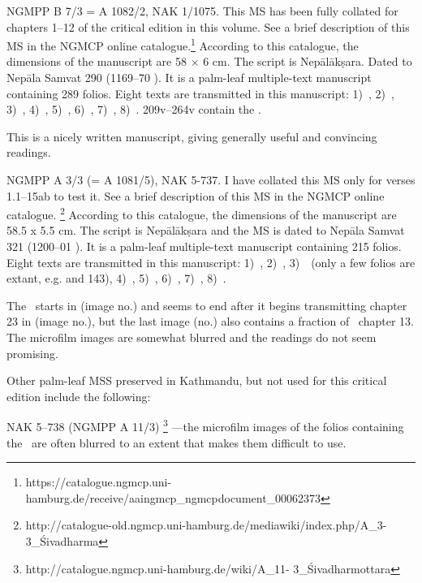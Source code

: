NGMPP B 7/3 = A 1082/2, NAK 1/1075. This MS has been 
fully collated for chapters 1--12 of
the critical edition in this volume. See a brief description of this MS
in the NGMCP online catalogue.\footnote{https://catalogue.ngmcp.uni-hamburg.de/receive/aaingmcp\_ngmcpdocument\_00062373}
According to this catalogue, the dimensions of the manuscript are 
58 × 6 cm. The script is Nepālākṣara. Dated to Nepāla Samvat 
290 (1169--70 \CE). It is a
palm-leaf multiple-text manuscript containing 289 folios. Eight texts
are transmitted in this manuscript: 
1)~\SDhS,
2)~\SDhU,
3)~\SDhSangr,
4)~\Ums,
5)~\SivaUp,
6)~\Vss,
7)~\Uums,
8)~\DharmP.
\Fols209v--264v contain the \VSS.

This is a nicely written manuscript, giving generally useful and
convincing readings. 


NGMPP A 3/3 (= A 1081/5), NAK 5-737. I have collated 
this MS only for verses 1.1--15ab to test it. 
See a brief description of this MS in the NGMCP online
catalogue.%
	\footnote{http://catalogue-old.ngmcp.uni-hamburg.de/mediawiki/index.php/A\_3-3\_Śivadharma} 
According to this catalogue, the dimensions of the manuscript are
58.5 x 5.5 cm. The script is Nepālākṣara and the MS is dated 
to Nepāla Samvat 321 (1200--01 \CE). It is a palm-leaf multiple-text manuscript containing 215 folios.
Eight texts are transmitted in this manuscript: 
1)~\SDhS,
2)~\SDhU,
3)~\SDhSangr\ (only a few folios are extant, e.g.  and 143), 
4)~\Ums,
5)~\SivaUp,
6)~\Uums,
7)~\Vss,
8)~\DharmP.

The \VSS\ starts in  (image no.) 
and seems to end after it begins transmitting chapter 23 
in  (image no.), but the last image 
(no.) also contains a fraction of \VSS\ chapter 13.
The microfilm images are somewhat blurred and the 
readings do not seem promising.

\bigskip
\bigskip

\noindent
Other palm-leaf MSS preserved in Kathmandu, but not used for
this critical edition include the following:

NAK 5--738 (NGMPP A 11/3)%
	\footnote{http://catalogue.ngmcp.uni-hamburg.de/wiki/A\_11- 3\_Śivadharmottara}%
---the microfilm images of the folios containing the \VSS\ are often blurred to an extent that makes them
difficult to use.


